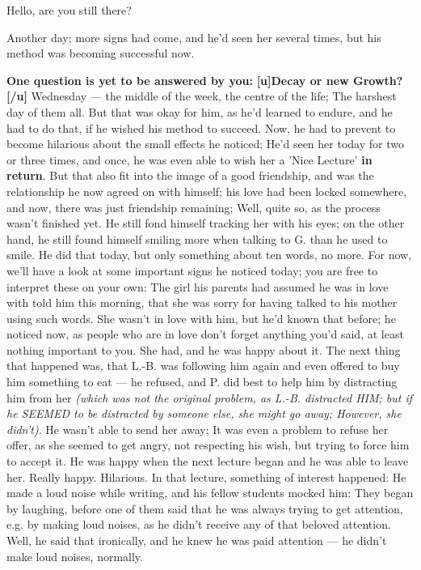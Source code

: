 Hello, are you still there?

Another day; more signs had come, and he'd seen her several times, but his method was becoming successful now. 

\textbf{One question is yet to be answered by you:}
\textbf{[u]Decay or new Growth?[/u]}
Wednesday --- the middle of the week, the centre of the life; The harshest day of them all. 
But that was okay for him, as he'd learned to endure, and he had to do that, if he wished his method to succeed. Now, he had to prevent to become hilarious about the small effects he noticed; He'd seen her today for two or three times, and once, he was even able to wish her a 'Nice Lecture' \textbf{in return}. But that also fit into the image of a good friendship, and was the relationship he now agreed on with himself; his love had been locked somewhere, and now, there was just friendship remaining; Well, quite so, as the process wasn't finished yet. He still fond himself tracking her with his eyes; on the other hand, he still found himself smiling more when talking to G. than he used to smile. 
He did that today, but only something about ten words, no more. 
For now, we'll have a look at some important signs he noticed today; you are free to interpret these on your own: 
The girl his parents had assumed he was in love with told him this morning, that she was sorry for having talked to his mother using such words. 
She wasn't in love with him, but he'd known that before; he noticed now, as people who are in love don't forget anything you'd said, at least nothing important to you. 
She had, and he was happy about it. 
The next thing that happened was, that L.-B. was following him again and even offered to buy him something to eat --- he refused, and P. did best to help him by distracting him from her \emph{(which was not the original problem, as L.-B. distracted HIM; but if he SEEMED to be distracted by someone else, she might go away; However, she didn't)}.
He wasn't able to send her away; It was even a problem to refuse her offer, as she seemed to get angry, not respecting his wish, but trying to force him to accept it. 
He was happy when the next lecture began and he was able to leave her. 
Really happy. 
Hilarious. 
In that lecture, something of interest happened: He made a loud noise while writing, and his fellow students mocked him: They began by laughing, before one of them said that he was always trying to get attention, e.g. by making loud noises, as he didn't receive any of that beloved attention. 
Well, he said that ironically, and he knew he was paid attention --- he didn't make loud noises, normally. 
